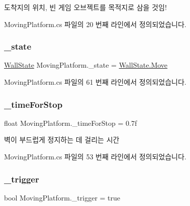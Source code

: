 도착지의 위치, 빈 게임 오브젝트를 목적지로 삼을 것임! 



Moving\+Platform.\+cs 파일의 20 번째 라인에서 정의되었습니다.

\mbox{\label{class_moving_platform_abd03a1d4800fd5fa8ab4ef8ce5a688db}} 
\subsubsection{\texorpdfstring{\_state}{\_state}}
{\footnotesize\ttfamily \mbox{\hyperlink{class_moving_platform_ac47e764b71989317aab0bad26d82a901}{Wall\+State}} Moving\+Platform.\+\_\+state = \mbox{\hyperlink{class_moving_platform_ac47e764b71989317aab0bad26d82a901a6bc362dbf494c61ea117fe3c71ca48a5}{Wall\+State.\+Move}}\hspace{0.3cm}{\ttfamily [private]}}



Moving\+Platform.\+cs 파일의 61 번째 라인에서 정의되었습니다.

\mbox{\label{class_moving_platform_a69791dc347a05d5513e82cd445640cf4}} 
\subsubsection{\texorpdfstring{\_timeForStop}{\_timeForStop}}
{\footnotesize\ttfamily float Moving\+Platform.\+\_\+time\+For\+Stop = 0.\+7f\hspace{0.3cm}{\ttfamily [private]}}



벽이 부드럽게 정지하는 데 걸리는 시간 



Moving\+Platform.\+cs 파일의 53 번째 라인에서 정의되었습니다.

\mbox{\label{class_moving_platform_a98e69f4b8bfe702ef2bc6a8d77a03b8a}} 
\subsubsection{\texorpdfstring{\_trigger}{\_trigger}}
{\footnotesize\ttfamily bool Moving\+Platform.\+\_\+trigger = true\hspace{0.3cm}{\ttfamily [private]}}




